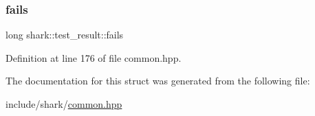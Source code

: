 \subsubsection{\texorpdfstring{fails}{fails}}
{\footnotesize\ttfamily long shark\+::test\+\_\+result\+::fails}



Definition at line 176 of file common.\+hpp.



The documentation for this struct was generated from the following file\+:\begin{DoxyCompactItemize}
\item 
include/shark/\hyperlink{common_8hpp}{common.\+hpp}\end{DoxyCompactItemize}

